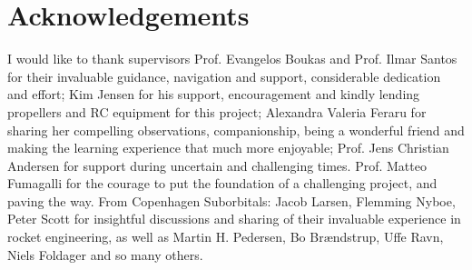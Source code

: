 \chapter{Acknowledgements}

I would like to thank supervisors Prof. Evangelos Boukas and Prof. Ilmar Santos for their invaluable guidance, navigation and support, considerable dedication and effort;
Kim Jensen for his support, encouragement and kindly lending propellers and RC equipment for this project; Alexandra Valeria Feraru for sharing her compelling observations, companionship, being a wonderful friend and making the learning experience that much more enjoyable;
Prof. Jens Christian Andersen for support during uncertain and challenging times. 
Prof. Matteo Fumagalli for the courage to put the foundation of a challenging project, and paving the way.
From Copenhagen Suborbitals: Jacob Larsen, Flemming Nyboe, Peter Scott for insightful discussions and sharing of their invaluable experience in rocket engineering, as well as Martin H. Pedersen, Bo Brændstrup, Uffe Ravn, Niels Foldager and so many others.


